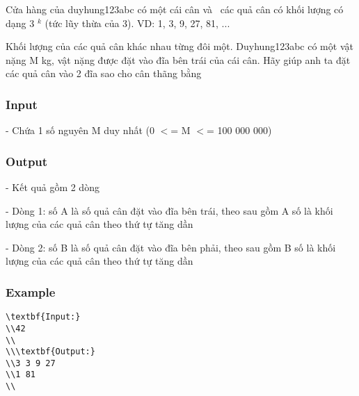 



   Cửa hàng của duyhung123abc có một cái cân và  các quả cân có khối lượng có dạng 3   $^    k   $   (tức lũy thừa của 3). VD: 1, 3, 9, 27, 81, ...  

   Khối lượng của các quả cân khác nhau từng đôi một. Duyhung123abc có một vật nặng M kg, vật nặng được đặt vào đĩa bên trái của cái cân. Hãy giúp anh ta đặt các quả cân vào 2 đĩa sao cho cân thãng bằng  

\subsubsection{   Input  }

   - Chứa 1 số nguyên M duy nhất (0 $<$= M $<$= 100 000 000)  

\subsubsection{   Output  }

   - Kết quả gồm 2 dòng  

   - Dòng 1: số A là số quả cân đặt vào đĩa bên trái, theo sau gồm A số là khối lượng của các quả cân theo thứ tự tăng dần  

   - Dòng 2: số B là số quả cân đặt vào đĩa bên phải, theo sau gồm B số là khối lượng của các quả cân theo thứ tự tăng dần  

\subsubsection{   Example  }
\begin{verbatim}
\textbf{Input:}
\\42
\\
\\\textbf{Output:}
\\3 3 9 27
\\1 81
\\\end{verbatim}